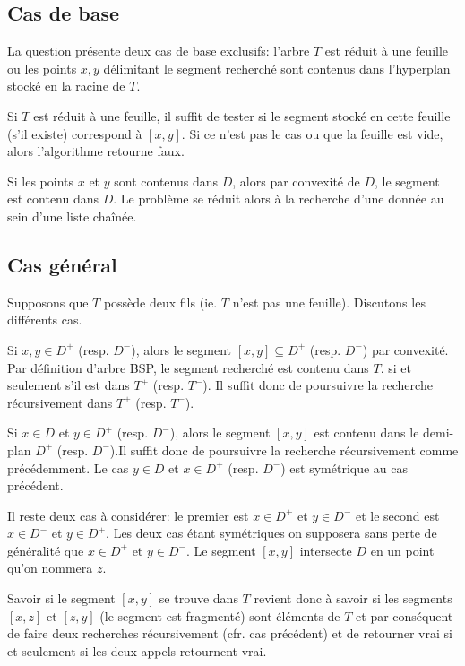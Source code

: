 
\subsection{Cas de base}
La question présente deux cas de base exclusifs: l'arbre $T$ est
réduit à une feuille ou les points $x, y$ délimitant le segment
recherché sont contenus dans l'hyperplan stocké en la racine de $T$.

Si $T$ est réduit à une feuille, il suffit de tester si le segment
stocké en cette feuille (s'il existe) correspond à $[x, y]$. Si ce
n'est pas le cas ou que la feuille est vide, alors l'algorithme
retourne faux.

Si les points $x$ et $y$ sont contenus dans $D$, alors par convexité
de $D$, le segment est contenu dans $D$. Le problème se réduit alors
à la recherche d'une donnée au sein d'une liste chaînée.

\subsection{Cas général}
Supposons que $T$ possède deux fils (ie. $T$ n'est pas une feuille).
Discutons les différents cas.

Si $x,y \in D^+$ (resp. $D^-$), alors le segment $[x,y] \subseteq D^+$
(resp. $D^-$) par convexité. Par définition d'arbre BSP,
le segment recherché est contenu dans $T$. si et seulement s'il
est dans $T^+$ (resp. $T^-$). Il suffit donc de poursuivre la
recherche récursivement dans $T^+ $ (resp. $T^-$).

Si $x \in D $ et $y \in D^+$ (resp. $D^-$), alors le segment $[x, y]$ est
contenu dans le demi-plan $D^+$ (resp. $D^-$).Il suffit donc de poursuivre la
recherche récursivement comme précédemment. Le cas $y \in D $ et $x \in D^+$
(resp. $D^-$) est symétrique au cas précédent.

Il reste deux cas à considérer: le premier est $ x \in D^+$ et $ y \in D^-$ et
le second est $x \in D^-$ et $ y \in D^+$. Les deux cas étant symétriques on
supposera sans perte de généralité que $ x \in D^+$ et $ y \in D^-$.
Le segment $[x,y]$ intersecte $D$ en un point qu'on nommera $z$.

Savoir si le segment $[x,y]$ se trouve dans $T$ revient donc à savoir si
les segments $[x,z]$ et $[z,y]$ (le segment est fragmenté) sont
éléments de $T$ et par conséquent de faire deux recherches
récursivement (cfr. cas précédent) et de retourner vrai si et
seulement si les deux appels retournent vrai.

